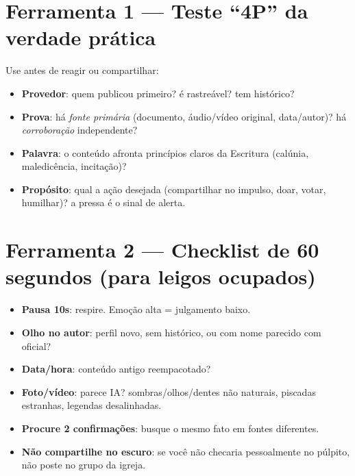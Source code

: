 \section{Ferramenta 1 — Teste ``4P'' da verdade prática}
Use antes de reagir ou compartilhar:
\begin{checklist}[title={4P: Provedor, Prova, Palavra, Propósito}]
\begin{itemize}[leftmargin=*,noitemsep]
  \item \textbf{Provedor}: quem publicou primeiro? é rastreável? tem histórico?
  \item \textbf{Prova}: há \emph{fonte primária} (documento, áudio/vídeo original, data/autor)? há \emph{corroboração} independente?
  \item \textbf{Palavra}: o conteúdo afronta princípios claros da Escritura (calúnia, maledicência, incitação)?
  \item \textbf{Propósito}: qual a ação desejada (compartilhar no impulso, doar, votar, humilhar)? a pressa é o sinal de alerta.
\end{itemize}
\end{checklist}

\section{Ferramenta 2 — Checklist de 60 segundos (para leigos ocupados)}
\begin{checklist}
\begin{itemize}[leftmargin=*,noitemsep]
  \item \textbf{Pausa 10s}: respire. Emoção alta = julgamento baixo.
  \item \textbf{Olho no autor}: perfil novo, sem histórico, ou com nome parecido com oficial?
  \item \textbf{Data/hora}: conteúdo antigo reempacotado?
  \item \textbf{Foto/vídeo}: parece IA? sombras/olhos/dentes não naturais, piscadas estranhas, legendas desalinhadas.
  \item \textbf{Procure 2 confirmações}: busque o mesmo fato em fontes diferentes.
  \item \textbf{Não compartilhe no escuro}: se você não checaria pessoalmente no púlpito, não poste no grupo da igreja.
\end{itemize}
\end{checklist}


